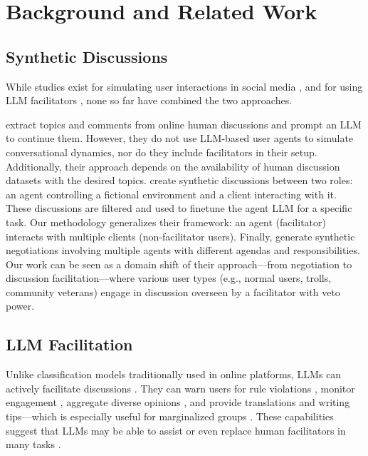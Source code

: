 %
\section{Background and Related Work}

\subsection{Synthetic Discussions}
\label{ssec:related:discussions}

While studies exist for simulating user interactions in social media \cite{park_simulacra, mou_2024, tornberg_2023, y_social}, and for using LLM facilitators \cite{kim_et_al_chatbot, cho-etal-2024-language}, none so far have combined the two approaches. 

\citet{balog_2024} extract topics and comments from online human discussions and prompt an LLM to continue them. However, they do not use LLM-based user agents to simulate conversational dynamics, nor do they include facilitators in their setup. Additionally, their approach depends on the availability of human discussion datasets with the desired topics. \citet{ulmer2024} create synthetic discussions between two roles: an agent controlling a fictional environment and a client interacting with it. These discussions are filtered and used to finetune the agent LLM for a specific task. Our methodology generalizes their framework: an agent (facilitator) interacts with multiple clients (non-facilitator users). Finally, \citet{abdelnabi_negotiations} generate synthetic negotiations involving multiple agents with different agendas and responsibilities. Our work can be seen as a domain shift of their approach---from negotiation to discussion facilitation---where various user types (e.g., normal users, trolls, community veterans) engage in discussion overseen by a facilitator with veto power.


\subsection{LLM Facilitation}

Unlike classification models traditionally used in online platforms, LLMs can actively facilitate discussions \cite{korre2025evaluation}. They can warn users for rule violations \cite{Kumar_AbuHashem_Durumeric_2024}, monitor engagement \cite{schroeder-etal-2024-fora}, aggregate diverse opinions \cite{small-polis-llm}, and provide translations and writing tips---which is especially useful for marginalized groups \cite{Tsai2024Generative}. These capabilities suggest that LLMs may be able to assist or even replace human facilitators in many tasks \cite{small-polis-llm, seering_self_moderation}.

